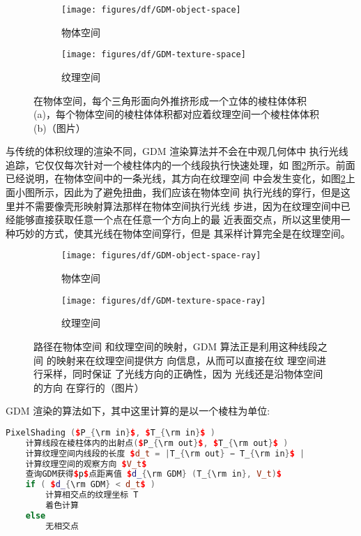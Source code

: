 \begin{figure}
	\begin{subfigure}[b]{0.49\textwidth}
		\texttt{[image: figures/df/GDM-object-space]}
		\caption{物体空间}
	\end{subfigure}
	\begin{subfigure}[b]{0.51\textwidth}
		\texttt{[image: figures/df/GDM-texture-space]}
		\caption{纹理空间}
	\end{subfigure}
	\caption{在物体空间，每个三角形面向外推挤形成一个立体的棱柱体体积 (a)，每个物体空间的棱柱体体积都对应着纹理空间一个棱柱体体积 (b)（图片\cite{a:GeneralizedDisplacementMaps}）}
	\label{f:df-GDM-space}
\end{figure}

与传统的体积纹理的渲染不同，GDM 渲染算法并不会在中观几何体中 执行光线追踪，它仅仅每次针对一个棱柱体内的一个线段执行快速处理，如 图\ref{f:df-GDM-space-ray}所示。前面已经说明，在物体空间中的一条光线，其方向在纹理空间 中会发生变化，如图\ref{f:df-GDM-space-ray}上面小图所示，因此为了避免扭曲，我们应该在物体空间 执行光线的穿行，但是这里并不需要像壳形映射算法那样在物体空间执行光线 步进，因为在纹理空间中已经能够直接获取任意一个点在任意一个方向上的最 近表面交点，所以这里使用一种巧妙的方式，使其光线在物体空间穿行，但是 其采样计算完全是在纹理空间。

\begin{figure}
\begin{center}
	\begin{subfigure}[b]{0.35\textwidth}
		\texttt{[image: figures/df/GDM-object-space-ray]}
		\caption{物体空间}
	\end{subfigure}
	\begin{subfigure}[b]{0.35\textwidth}
		\texttt{[image: figures/df/GDM-texture-space-ray]}
		\caption{纹理空间}
	\end{subfigure}
\end{center}
	\caption{路径在物体空间 和纹理空间的映射，GDM 算法正是利用这种线段之间 的映射来在纹理空间提供方 向信息，从而可以直接在纹 理空间进行采样，同时保证 了光线方向的正确性，因为 光线还是沿物体空间的方向 在穿行的（图片\cite{a:GeneralizedDisplacementMaps}）}
	\label{f:df-GDM-space-ray}
\end{figure}

GDM 渲染的算法如下，其中这里计算的是以一个棱柱为单位:

\begin{lstlisting}[language=C++, mathescape=true]
PixelShading ($P_{\rm in}$, $T_{\rm in}$ ) 
	计算线段在棱柱体内的出射点($P_{\rm out}$, $T_{\rm out}$ ) 
	计算纹理空间内线段的长度 $d_t = |T_{\rm out} − T_{\rm in}$ | 
	计算纹理空间的观察方向 $V_t$
	查询GDM获得$p$点距离值 $d_{\rm GDM} (T_{\rm in}, V_t)$
	if ( $d_{\rm GDM} < d_t$ )
		计算相交点的纹理坐标 T
		着色计算
	else
		无相交点
\end{lstlisting}

